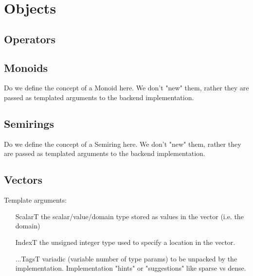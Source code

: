 \chapter{Objects}
\label{Chp:Objects}


\section{Operators}


\section{Monoids}

Do we define the concept of a Monoid here.  We don't "new" them, rather they
are passed as templated arguments to the backend implementation.




\section{Semirings}

Do we define the concept of a Semiring here.  We don't "new" them, rather they
are passed as templated arguments to the backend implementation.



\section{Vectors}
\label{Sec:Vectors}

Template arguments:
\begin{itemize}[leftmargin=1.1in]
\item[ScalarT]  the scalar/value/domain type stored as values in the vector (i.e. the domain)
\item[IndexT]   the unsigned integer type used to specify a location in the vector.
\item[...TagsT] variadic (variable number of type params) to be unpacked by the implementation.
Implementation "hints" or "suggestions" like sparse vs dense.
\end{itemize}


